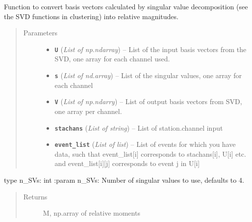 \documentclass[a4paper,10pt,english]{sphinxmanual}
\begin{document}
\begin{fulllineitems}
\label{submodules/utils.mag_calc:mag_calc.SVD_moments}
Function to convert basis vectors calculated by singular value decomposition    (see the SVD functions in clustering) into relative magnitudes.
\begin{quote}\begin{description}
\item[{Parameters}] \leavevmode\begin{itemize}
\item {} 
\textbf{\texttt{U}} (\emph{List of np.ndarray}) -- List of the input basis vectors from the SVD, one array for each            channel used.

\item {} 
\textbf{\texttt{s}} (\emph{List of nd.array}) -- List of the singular values, one array for each channel

\item {} 
\textbf{\texttt{V}} (\emph{List of np.ndarry}) -- List of output basis vectors from SVD, one array per channel.

\item {} 
\textbf{\texttt{stachans}} (\emph{List of string}) -- List of station.channel input

\item {} 
\textbf{\texttt{event\_list}} (\emph{List of list}) -- List of events for which you have data, such that                event\_list{[}i{]} corresponds to stachans{[}i{]}, U{[}i{]} etc. and                event\_list{[}i{]}{[}j{]} corresponds to event j in U{[}i{]}

\end{itemize}

\end{description}\end{quote}

type n\_SVs: int
:param n\_SVs: Number of singular values to use, defaults to 4.
\begin{quote}\begin{description}
\item[{Returns}] \leavevmode
M, np.array of relative moments

\end{description}\end{quote}

\end{fulllineitems}
\end{document}
